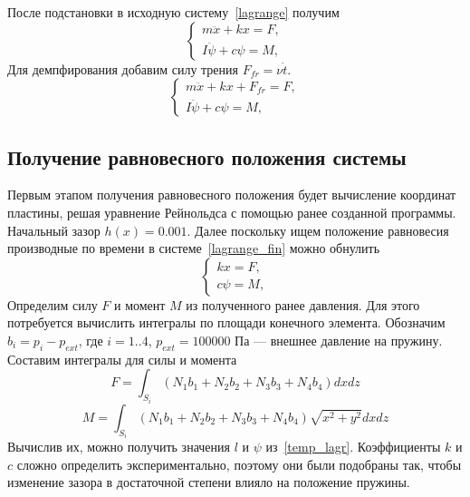 \documentclass[a4paper,14pt]{extarticle}
\begin{document}
После подстановки в исходную систему~\eqref{lagrange} получим
\begin{equation*}
	\begin{cases*}
		m \ddot{x} + k x = F, \\
		I \ddot{\psi} + c \psi = M,
	\end{cases*}
\end{equation*}
Для демпфирования добавим силу трения $F_{fr} = \nu \dot{t}$.
\begin{equation}
	\begin{cases*}
		m \ddot{x} + k x + F_{fr} = F, \\
		I \ddot{\psi} + c \psi = M,
	\end{cases*}
	\label{lagrange_fin}
\end{equation}

\subsection{Получение равновесного положения системы}

Первым этапом получения равновесного положения будет вычисление координат пластины, решая уравнение Рейнольдса с помощью ранее созданной программы. Начальный зазор $h(x) = 0.001$.
Далее поскольку ищем положение равновесия производные по времени в системе~\eqref{lagrange_fin} можно обнулить
\begin{equation}
	\begin{cases*}
		k x = F, \\
		c \psi = M,
	\end{cases*}
\label{temp_lagr}
\end{equation}
Определим силу $F$ и момент $M$ из полученного ранее давления. Для этого потребуется вычислить интегралы по площади конечного элемента. Обозначим $b_i = p_i - p_{ext}$, где $i = 1..4$, $p_{ext} = 100000$ Па --- внешнее давление на пружину. Составим интегралы для силы и момента
\begin{equation*}
	F = \int_{S_i} { \left( N_1 b_1 + N_2 b_2 + N_3 b_3 + N_4 b_4 \right)  dx dz}
\end{equation*}
\begin{equation*}
	M = \int_{S_i} { \left( N_1 b_1 + N_2 b_2 + N_3 b_3 + N_4 b_4 \right) \sqrt{x^2 + y^2}  dx dz}
\end{equation*}
Вычислив их, можно получить значения $l$ и $\psi$ из~\eqref{temp_lagr}. Коэффициенты $k$ и $c$ сложно определить экспериментально, поэтому они были подобраны так, чтобы изменение зазора в достаточной степени влияло на положение пружины.
\end{document}
